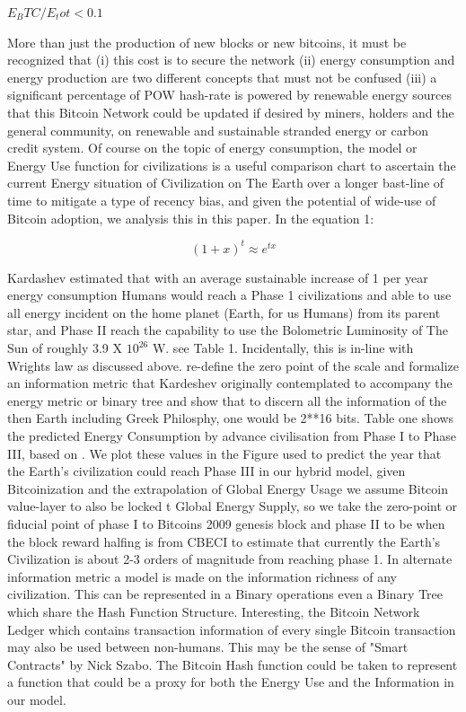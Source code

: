 \documentclass[final,5p,times,twocolumn,authoryear]{elsarticle}
\begin{document}
$E_BTC/E_tot < 0.1$

More than just the production of new blocks or new bitcoins, it must be recognized that (i) this cost is to secure the network (ii) energy consumption and energy production are two different concepts that must not be confused (iii) a significant percentage of POW hash-rate is powered by renewable energy sources that this Bitcoin Network could be updated if desired by miners, holders and the general community, on renewable and sustainable stranded energy or carbon credit system. Of course on the topic of energy consumption, the \cite{kar64} model or Energy Use function for civilizations is a useful comparison chart to ascertain the current Energy situation of Civilization on The Earth over a longer bast-line of time to mitigate a type of recency bias, and given the potential of wide-use of Bitcoin adoption, we analysis this in this paper. In the \cite{kar64} equation 1:

\begin{equation}
    (1+x)^t \approx e^{tx}
\end{equation}

Kardashev estimated that with an average sustainable increase of 1 \percent per year energy consumption Humans would reach a Phase 1 civilizations and able to use all energy incident on the home planet (Earth, for us Humans) from its parent star, and Phase II reach the capability to use the Bolometric Luminosity of The Sun of roughly 3.9 X $10^{26}$ W. see Table 1. Incidentally, this is in-line with Wrights law as  discussed above. \cite{Sagan73} re-define the zero point of the scale and formalize an information metric that Kardeshev originally contemplated to accompany the energy metric or binary tree and show that to discern all the information of the then Earth including Greek Philosphy, one would be 2**16 bits. Table one shows the predicted Energy Consumption by advance civilisation from Phase I to Phase III, based on \cite{kar64}. We plot these values in the Figure  used to predict the year that the Earth's civilization could reach Phase III in our hybrid model, given Bitcoinization and the extrapolation of Global Energy Usage we assume Bitcoin value-layer to also be locked t Global Energy Supply, so we take the zero-point or fiducial point of phase I to Bitcoins 2009 genesis block and phase II to be when the block reward halfing is from CBECI to  estimate that currently the Earth's Civilization is about 2-3 orders of magnitude from reaching phase 1. In \cite{Sagan73} alternate information metric a model is made on the information richness of any civilization. This can be represented in a Binary operations even a Binary Tree which share the Hash Function Structure. Interesting, the Bitcoin Network Ledger which contains transaction information of every single Bitcoin transaction may also be used between non-humans. This may be the sense of "Smart Contracts" by Nick Szabo. The Bitcoin Hash function could be taken to represent a function that could be a proxy for both the Energy Use and the Information in our model. 
\end{document}
